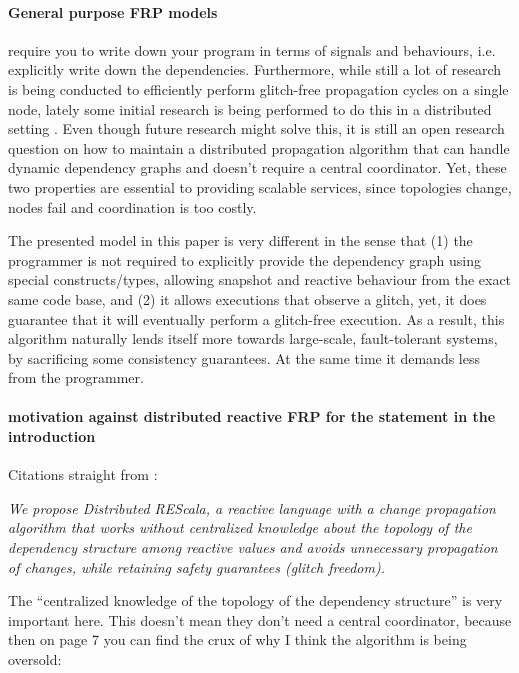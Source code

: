  




\paragraph{General purpose FRP models} \cite{reactivesurvey} require you to write down your program in terms of signals and behaviours, i.e. explicitly write down the dependencies. Furthermore, while still a lot of research is being conducted to efficiently perform glitch-free propagation cycles on a single node, lately some initial research is being performed to do this in a distributed setting \cite{elm}\cite{drescala}. Even though future research might solve this, it is still an open research question on how to maintain a distributed propagation algorithm that can handle dynamic dependency graphs and doesn't require a central coordinator. Yet, these two properties are essential to providing scalable services, since topologies change, nodes fail and coordination is too costly.

The presented model in this paper is very different in the sense that (1) the programmer is not required to explicitly provide the dependency graph using special constructs/types, allowing snapshot and reactive behaviour from the exact same code base, and (2) it allows executions that observe a glitch, yet, it does guarantee that it will eventually perform a glitch-free execution. As a result, this algorithm naturally lends itself more towards large-scale, fault-tolerant systems, by sacrificing some consistency guarantees. At the same time it demands less from the programmer. \newline


\paragraph{motivation against distributed reactive FRP for the statement in the introduction}
Citations straight from \cite{drescala}:

\emph{We propose Distributed REScala, a reactive language
with a change propagation algorithm that works without
centralized knowledge about the topology of the dependency
structure among reactive values and avoids unnecessary
propagation of changes, while retaining safety guarantees
(glitch freedom).}

The ``centralized knowledge of the topology of the dependency structure'' is very important here. This doesn't mean they don't need a central coordinator, because then on page 7 you can find the crux of why I think the algorithm is being oversold:


